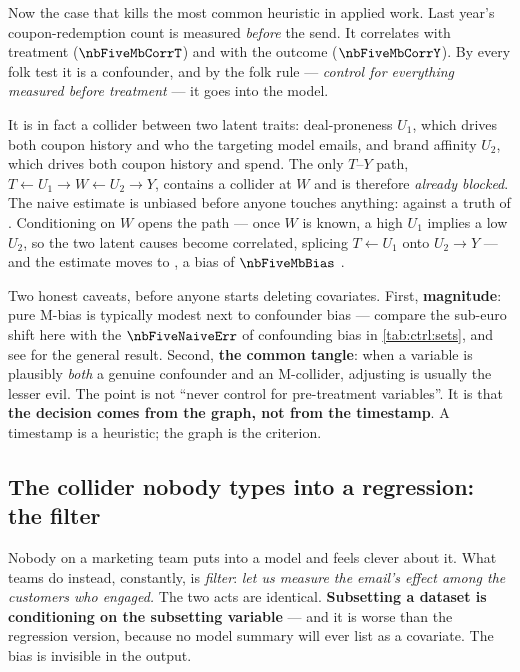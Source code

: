 Now the case that kills the most common heuristic in applied work. Last year's coupon-redemption
count is measured \emph{before} the send. It correlates with treatment ($\nbFiveMbCorrT$) and
with the outcome ($\nbFiveMbCorrY$). By every folk test it is a confounder, and by the folk rule
--- \emph{control for everything measured before treatment} --- it goes into the model.

It is in fact a collider between two latent traits: deal-proneness $U_1$, which drives both
coupon history and who the targeting model emails, and brand affinity $U_2$, which drives both
coupon history and spend. The only $T$--$Y$ path,
$T \leftarrow U_1 \to W \leftarrow U_2 \to Y$, contains a collider at $W$ and is therefore
\emph{already blocked}. The naive estimate is unbiased before anyone touches anything:
\eur{\nbFiveMbNone} against a truth of \eur{\nbFiveMbTrue}. Conditioning on $W$ opens the path --- once $W$
is known, a high $U_1$ implies a low $U_2$, so the two latent causes become correlated, splicing
$T \leftarrow U_1$ onto $U_2 \to Y$ --- and the estimate moves to \eur{\nbFiveMbCtrl}, a bias of
$\nbFiveMbBias$ \citep{ding2015}.

Two honest caveats, before anyone starts deleting covariates. First, \textbf{magnitude}: pure
M-bias is typically modest next to confounder bias --- compare the sub-euro shift here with the
$\nbFiveNaiveErr$ of confounding bias in \cref{tab:ctrl:sets}, and see \citet{ding2015} for the
general result. Second, \textbf{the common tangle}: when a variable is plausibly \emph{both} a
genuine confounder and an M-collider, adjusting is usually the lesser evil. The point is not
``never control for pre-treatment variables''. It is that \textbf{the decision comes from the
graph, not from the timestamp}. A timestamp is a heuristic; the graph is the criterion.

\subsection*{The collider nobody types into a regression: the filter}

Nobody on a marketing team puts  into a model and feels clever about it. What
teams do instead, constantly, is \emph{filter}: \emph{let us measure the email's effect among the
customers who engaged.} The two acts are identical. \textbf{Subsetting a dataset is conditioning
on the subsetting variable} --- and it is worse than the regression version, because no model
summary will ever list  as a covariate. The bias is invisible in the output.

